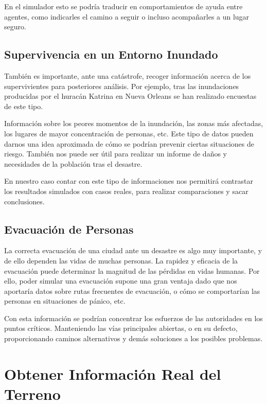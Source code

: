 En el simulador esto se podría traducir en comportamientos de ayuda entre
agentes, como indicarles el camino a seguir o incluso acompañarles a un
lugar seguro.

\subsection{Supervivencia en un Entorno Inundado}

También es importante, ante una catástrofe, recoger información acerca de los
supervivientes para posteriores análisis. Por ejemplo, tras las inundaciones
producidas por el huracán Katrina en Nueva Orleans se han realizado
encuestas\cite{Washington05} de este tipo.

Información sobre los peores momentos de la inundación, las zonas más afectadas,
los lugares de mayor concentración de personas, etc. Este tipo de datos pueden
darnos una idea aproximada de cómo se podrían prevenir ciertas situaciones de
riesgo. También nos puede ser útil para realizar un informe de daños y
necesidades de la población tras el desastre.

En nuestro caso contar con este tipo de informaciones nos permitirá contrastar
los resultados simulados con casos reales, para realizar comparaciones y sacar
conclusiones.

\subsection{Evacuación de Personas}

La correcta evacuación de una ciudad ante un desastre es algo muy importante, y
de ello dependen las vidas de muchas personas. La rapidez y eficacia de la
evacuación puede determinar la magnitud de las pérdidas en vidas humanas. Por
ello, poder simular una evacuación supone una gran ventaja dado que nos
aportaría datos sobre rutas frecuentes de evacuación\cite{Lammel08}, o cómo se
comportarían las personas en situaciones de pánico\cite{Chu05}, etc.

Con esta información se podrían concentrar los esfuerzos de las autoridades en
los puntos críticos. Manteniendo las vías principales abiertas, o en su defecto,
proporcionando caminos alternativos y demás soluciones a los posibles problemas.

\section{Obtener Información Real del Terreno}

